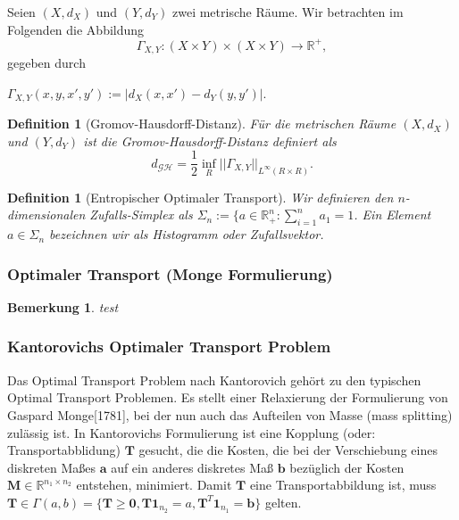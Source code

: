 \documentclass[twoside, 12pt,a4paper]{article}
\def\emph#1{\textit{#1}}
\newtheorem{definition}[theorem]{Definition}
\newtheorem{remark}[theorem]{Bemerkung}
\numberwithin{equation}{section}
\begin{document}
	Seien $(X,d_X)$ und $(Y,d_Y)$ zwei metrische Räume. Wir betrachten im Folgenden die Abbildung
	\begin{equation}
		\Gamma_{X,Y}: (X\times Y) \times (X \times Y) \to \mathbb{R^{+}},
	\end{equation}
	gegeben durch
	
	$\Gamma_{X,Y}(x,y,x',y'):= |d_X(x,x') - d_Y(y,y')|$.
	
	\begin{definition}[Gromov-Hausdorff-Distanz]
	Für die metrischen Räume $(X,d_X)$ und $(Y,d_Y)$ ist die \emph{Gromov-Hausdorff-Distanz} definiert als
	\begin{equation}
		d_{\mathcal{G}\mathcal{H}} = \frac{1}{2}\inf_{R}||\Gamma_{X,Y}||_{L^\infty(R \times R)}.
	\end{equation}
	\end{definition}
	\begin{definition}[Entropischer Optimaler Transport]
		Wir definieren den $n$-dimensionalen Zufalls-Simplex als $\Sigma_n := \lbrace a \in \mathbb{R}_+^n: \sum_{i=1}^{n}{a_1} = 1$. Ein Element $a \in \Sigma_n$ bezeichnen wir als Histogramm oder Zufallsvektor.
		
	\end{definition}
	\subsubsection{Optimaler Transport (Monge Formulierung)}
	\begin{remark}
		test
	\end{remark}
	\subsubsection{Kantorovichs Optimaler Transport Problem}
	Das Optimal Transport Problem nach Kantorovich gehört zu den typischen Optimal Transport Problemen. Es stellt einer Relaxierung der Formulierung von Gaspard Monge[1781], bei der nun auch das Aufteilen von Masse (mass splitting) zulässig ist.
	In Kantorovichs Formulierung ist eine Kopplung (oder: Transportabblidung) $\boldsymbol{T}$ gesucht, die die Kosten, die bei der Verschiebung eines diskreten Maßes $\boldsymbol{a}$ auf ein anderes diskretes Maß $\boldsymbol{b}$ bezüglich der Kosten $\boldsymbol{M} \in \mathbb{R}^{n_1 \times n_2}$ entstehen, minimiert.
	Damit $\boldsymbol{T}$ eine Transportabbildung ist, muss $\boldsymbol{T} \in \Gamma(a,b) = \lbrace \boldsymbol{T} \geq \boldsymbol{0}, \boldsymbol{T}\boldsymbol{1}_{n_2} = a, \boldsymbol{T}^{T}\boldsymbol{1}_{n_1} = \boldsymbol{b} \rbrace$ gelten.
	
\end{document}
